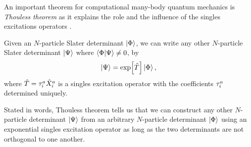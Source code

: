             An important theorem for computational many-body quantum mechanics
            is \emph{Thouless theorem} as it explains the role and the
            influence of the singles excitations operators
            \cite{thouless1960225}.
            \begin{theorem}
                Given an $N$-particle Slater determinant $\ket{\Phi}$, we can
                write any other $N$-particle Slater determinant $\ket{\Psi}$
                where $\braket{\Phi}{\Psi} \neq 0$, by
                \begin{align}
                    \ket{\Psi}
                    = \exp[\hat{T}]\ket{\Phi},
                \end{align}
                where $\hat{T} = \tau^{a}_{i}\hat{X}^{a}_{i}$ is a singles
                excitation operator with the coefficients $\tau^{a}_{i}$
                determined uniquely.
            \end{theorem}
            Stated in words, Thouless theorem tells us that we can construct any
            other $N$-particle determinant $\ket{\Psi}$ from an arbitrary
            $N$-particle determinant $\ket{\Phi}$ using an exponential singles
            excitation operator as long as the two determinants are not
            orthogonal to one another.

